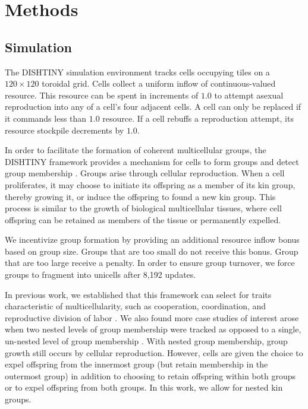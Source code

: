 \section{Methods} \label{sec:methods;ch:measuring-cna}

\subsection{Simulation}




The DISHTINY simulation environment tracks cells occupying tiles on a $120\times120$ toroidal grid.
Cells collect a uniform inflow of continuous-valued resource.
This resource can be spent in increments of $1.0$ to attempt asexual reproduction into any of a cell's four adjacent cells.
A cell can only be replaced if it commands less than $1.0$ resource.
If a cell rebuffs a reproduction attempt, its resource stockpile decrements by $1.0$.

In order to facilitate the formation of coherent multicellular groups, the DISHTINY framework provides a mechanism for cells to form groups and detect group membership \citep{moreno2019toward}.
Groups arise through cellular reproduction.
When a cell proliferates, it may choose to initiate its offspring as a member of its kin group, thereby growing it, or induce the offspring to found a new kin group.
This process is similar to the growth of biological multicellular tissues, where cell offspring can be retained as members of the tissue or permanently expelled.

We incentivize group formation by providing an additional resource inflow bonus based on group size.
Groups that are too small do not receive this bonus.
Group that are too large receive a penalty.
In order to ensure group turnover, we force groups to fragment into unicells after 8,192 updates.


In previous work, we established that this framework can select for traits characteristic of multicellularity, such as cooperation, coordination, and reproductive division of labor \cite{moreno2021exploring}.
We also found more case studies of interest arose when two nested levels of group membership were tracked
as opposed to a single, un-nested level of group membership \cite{moreno2021exploring}.
With nested group membership, group growth still occurs by cellular reproduction.
However, cells are given the choice to expel offspring from the innermost group (but retain membership in the outermost group) in addition to choosing to retain offspring within both groups or to expel offspring from both groups.
In this work, we allow for nested kin groups.

